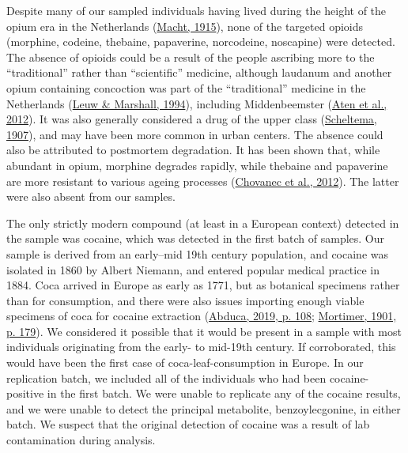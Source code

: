 \documentclass[
  b5paper,
]{book}
\begin{document}
Despite many of our sampled individuals having lived during the height
of the opium era in the Netherlands
(\protect\hyperlink{ref-machtHistoryOpium1915}{Macht, 1915}), none of
the targeted opioids (morphine, codeine, thebaine, papaverine,
norcodeine, noscapine) were detected. The absence of opioids could be a
result of the people ascribing more to the ``traditional'' rather than
``scientific'' medicine, although laudanum and another opium containing
concoction was part of the ``traditional'' medicine in the Netherlands
(\protect\hyperlink{ref-leuwProhibitionLegalization1994}{Leuw \&
Marshall, 1994}), including Middenbeemster
(\protect\hyperlink{ref-aten400Jaar2012}{Aten et al., 2012}). It was
also generally considered a drug of the upper class
(\protect\hyperlink{ref-scheltemaOpiumTrade1907}{Scheltema, 1907}), and
may have been more common in urban centers. The absence could also be
attributed to postmortem degradation. It has been shown that, while
abundant in opium, morphine degrades rapidly, while thebaine and
papaverine are more resistant to various ageing processes
(\protect\hyperlink{ref-chovanecOpiumMasses2012}{Chovanec et al.,
2012}). The latter were also absent from our samples.

The only strictly modern compound (at least in a European context)
detected in the sample was cocaine, which was detected in the first
batch of samples. Our sample is derived from an early--mid 19th century
population, and cocaine was isolated in 1860 by Albert Niemann, and
entered popular medical practice in 1884. Coca arrived in Europe as
early as 1771, but as botanical specimens rather than for consumption,
and there were also issues importing enough viable specimens of coca for
cocaine extraction (\protect\hyperlink{ref-abucaCocaTrade2019}{Abduca,
2019, p. 108}; \protect\hyperlink{ref-mortimerHistoryCoca1901}{Mortimer,
1901, p. 179}). We considered it possible that it would be present in a
sample with most individuals originating from the early- to mid-19th
century. If corroborated, this would have been the first case of
coca-leaf-consumption in Europe. In our replication batch, we included
all of the individuals who had been cocaine-positive in the first batch.
We were unable to replicate any of the cocaine results, and we were
unable to detect the principal metabolite, benzoylecgonine, in either
batch. We suspect that the original detection of cocaine was a result of
lab contamination during analysis.
\end{document}
